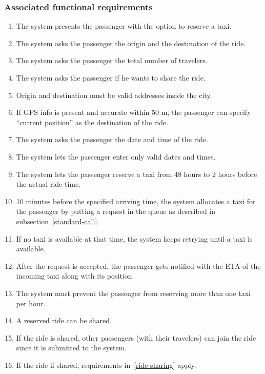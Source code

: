 \subsubsection{Associated functional requirements}
\begin{enumerate}
	\item The system presents the passenger with the option to reserve a taxi.
	\item The system asks the passenger the origin and the destination of the ride.
	\item The system asks the passenger the total number of travelers.
	\item The system asks the passenger if he wants to share the ride.
	\item Origin and destination must be valid addresses inside the city.
	\item If GPS info is present and accurate within 50 m, the passenger can specify ``current position'' as the destination of the ride.
	\item The system asks the passenger the date and time of the ride.
	\item The system lets the passenger enter only valid dates and times.
	\item The system lets the passenger reserve a taxi from 48 hours to 2 hours before the actual ride time.
	\item 10 minutes before the specified arriving time, the system allocates a taxi for the passenger by putting a request in the queue as described in subsection~\ref{standard-call}.
	\item If no taxi is available at that time, the system keeps retrying until a taxi is available.
	\item After the request is accepted, the passenger gets notified with the ETA of the incoming taxi along with its position.
	\item The system must prevent the passenger from reserving more than one taxi per hour.
	\item A reserved ride can be shared.
	\item If the ride is shared, other passengers (with their travelers) can join the ride since it is submitted to the system.
	\item If the ride if shared, requirements in~\autoref{ride-sharing} apply.
\end{enumerate}
